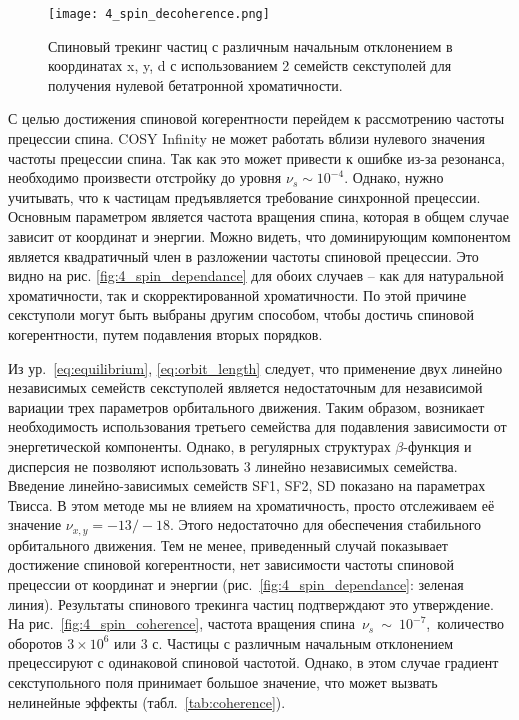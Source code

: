 \begin{figure}[!h]
  \centering
   \texttt{[image: 4\_spin\_decoherence.png]}
   \caption{Спиновый трекинг частиц с различным начальным отклонением в координатах x, y, d с использованием 2 семейств секступолей для получения нулевой бетатронной хроматичности.}
   \label{fig:4_spin_decoherence}
\end{figure}

\par С целью достижения спиновой когерентности перейдем к рассмотрению частоты прецессии спина. COSY Infinity \cite{cosy} не может работать вблизи нулевого значения частоты прецессии спина. Так как это может привести к ошибке из-за резонанса, необходимо произвести отстройку до уровня $\nu_s\sim{10}^{-4}$. Однако, нужно учитывать, что к частицам предъявляется требование синхронной прецессии. Основным параметром является частота вращения спина, которая в общем случае зависит от координат и энергии. Можно видеть, что доминирующим компонентом является квадратичный член в разложении частоты спиновой прецессии. Это видно на рис. \ref{fig:4_spin_dependance} для обоих случаев – как для натуральной хроматичности, так и скорректированной хроматичности. По этой причине секступоли могут быть выбраны другим способом, чтобы достичь спиновой когерентности, путем подавления вторых порядков.

\par Из ур.~\ref{eq:equilibrium}, \ref{eq:orbit_length} следует, что применение двух линейно независимых семейств секступолей является недостаточным для независимой вариации трех параметров орбитального движения. Таким образом, возникает необходимость использования третьего семейства для подавления зависимости от энергетической компоненты. Однако, в регулярных структурах $\beta$-функция и дисперсия не позволяют использовать 3 линейно независимых семейства. Введение линейно-зависимых семейств SF1, SF2, SD показано на параметрах Твисса. В этом методе мы не влияем на хроматичность, просто отслеживаем её значение $\nu_{x,y}=-13/-18$. Этого недостаточно для обеспечения стабильного орбитального движения. Тем не менее, приведенный случай показывает достижение спиновой когерентности, нет зависимости частоты спиновой прецессии от координат и энергии (рис.~\ref{fig:4_spin_dependance}: зеленая линия). Результаты спинового трекинга частиц подтверждают это утверждение. На рис.~\ref{fig:4_spin_coherence}, частота вращения спина~$\nu_s~\sim~{10}^{-7}$,~количество оборотов $3\times{10}^6$ или $3$ с. Частицы с различным начальным отклонением прецессируют с одинаковой спиновой частотой. Однако, в этом случае градиент секступольного поля принимает большое значение, что может вызвать нелинейные эффекты (табл.~\ref{tab:coherence}).

